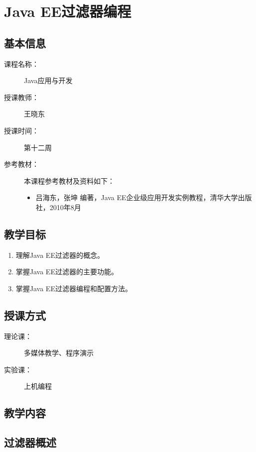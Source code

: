 \chapter{Java EE过滤器编程}
\label{chp:JavaEE-filter-programming}

\section*{基本信息}
\sline
\begin{description}
\item[课程名称：] Java应用与开发
\item[授课教师：] 王晓东
\item[授课时间：] 第十二周
\item[参考教材：] 本课程参考教材及资料如下：
  \begin{itemize}
  \item 吕海东，张坤 编著，Java EE企业级应用开发实例教程，清华大学出版社，2010年8月
  \end{itemize}
\end{description}

\section*{教学目标}

\sline

\begin{enumerate}
\item 理解Java EE过滤器的概念。
\item 掌握Java EE过滤器的主要功能。
\item 掌握Java EE过滤器编程和配置方法。  
\end{enumerate}  

\section*{授课方式}

\sline
\begin{description}
\item[理论课：] 多媒体教学、程序演示
\item[实验课：] 上机编程
\end{description}

\newpage
\section*{教学内容}
\sline
\section{过滤器概述}

